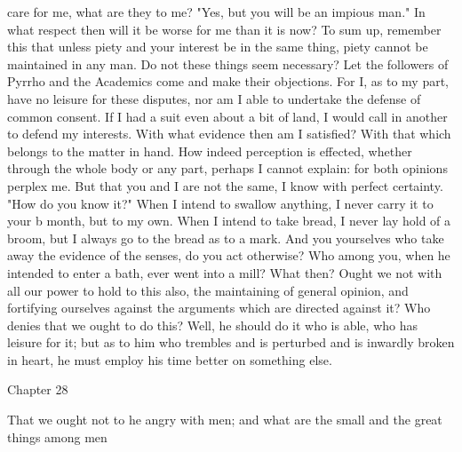 \documentclass[a4paper]{article}
\begin{document}
care for me, what are they to me? "Yes, but you will be an impious man." In
what respect then will it be worse for me than it is now? To sum up, remember
this that unless piety and your interest be in the same thing, piety cannot be
maintained in any man. Do not these things seem necessary?
    Let the followers of Pyrrho and the Academics come and make their
objections. For I, as to my part, have no leisure for these disputes, nor am I
able to undertake the defense of common consent. If I had a suit even about a
bit of land, I would call in another to defend my interests. With what evidence
then am I satisfied? With that which belongs to the matter in hand. How indeed
perception is effected, whether through the whole body or any part, perhaps I
cannot explain: for both opinions perplex me. But that you and I are not the
same, I know with perfect certainty. "How do you know it?" When I intend to
swallow anything, I never carry it to your b month, but to my own. When I
intend to take bread, I never lay hold of a broom, but I always go to the bread
as to a mark. And you yourselves who take away the evidence of the senses, do
you act otherwise? Who among you, when he intended to enter a bath, ever went
into a mill?
    What then? Ought we not with all our power to hold to this also, the
maintaining of general opinion, and fortifying ourselves against the arguments
which are directed against it? Who denies that we ought to do this? Well, he
should do it who is able, who has leisure for it; but as to him who trembles
and is perturbed and is inwardly broken in heart, he must employ his time
better on something else.

Chapter 28

That we ought not to he angry with men; and what are the small and the great
                               things among men
\end{document}
